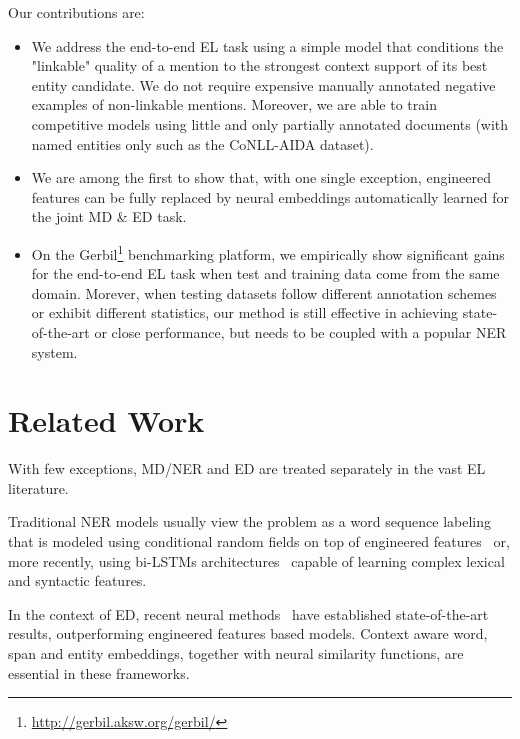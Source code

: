 \documentclass[11pt,a4paper]{article}
\begin{document}
Our contributions are:
\begin{itemize}
\item We address the end-to-end EL task using a simple model that conditions the "linkable" quality of a mention to the strongest context support of its best entity candidate. We do not require expensive manually annotated negative examples of non-linkable mentions. Moreover, we are able to train competitive models using little and only partially annotated documents (with named entities only such as the CoNLL-AIDA dataset). 
\item We are among the first to show that, with one single exception, engineered features can be fully replaced by neural embeddings automatically learned for the joint MD \& ED task. 
\item On the Gerbil\footnote{\url{http://gerbil.aksw.org/gerbil/}} benchmarking platform, we empirically show significant gains for the end-to-end EL task when test and training data come from the same domain. Morever, when testing datasets follow different annotation schemes or exhibit different statistics, our method is still effective in achieving state-of-the-art or close performance, but needs to be coupled with a popular NER system.
\end{itemize}

 
\section{Related Work}

With few exceptions, MD/NER and ED are treated separately in the vast EL literature.

Traditional NER models usually view the problem as a word sequence labeling that is modeled using conditional random fields on top of engineered features~\citep{finkel2005incorporating} or, more recently, using bi-LSTMs architectures~\citep{lample2016neural,chiu2016named,liu2017empower} capable of learning complex lexical and syntactic features.

In the context of ED, recent neural methods~\citep{he2013learning,sun2015modeling,yamada2016joint,ganea2017deep,le2018improving,yang2018collective,radhakrishnan2018elden} have established state-of-the-art results, outperforming engineered features based models. Context aware word, span and entity embeddings, together with neural similarity functions, are essential in these frameworks. 
\end{document}
